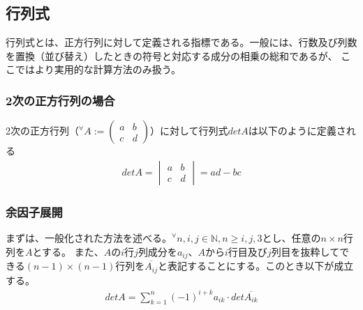\documentclass[10pt]{ujarticle}
\begin{document}
\subsection{行列式}
行列式とは、正方行列に対して定義される指標である。一般には、行数及び列数を置換（並び替え）したときの符号と対応する成分の相乗の総和であるが、
ここではより実用的な計算方法のみ扱う。

\subsubsection{2次の正方行列の場合}
2次の正方行列（$^\forall A:=(\begin{smallmatrix}a&b\\c&d\end{smallmatrix})$）に対して行列式$detA$は以下のように定義される
$$
\begin{aligned}
  detA=\begin{vmatrix} a & b\\ c & d \end{vmatrix}=ad-bc
\end{aligned}
$$
\subsubsection{余因子展開}
まずは、一般化された方法を述べる。$^\forall n,i,j\in\mathbb{N},n\geq i,j,3$とし、任意の$n\times n$行列を$A$とする。
また、$A$の$i$行$j$列成分を$a_{ij}$、$A$から$i$行目及び$j$列目を抜粋してできる$(n-1)\times(n-1)$行列を$\overline{A_{ij}}$と表記することにする。このとき以下が成立する。
$$
\begin{aligned}
  detA=\sum_{k=1}^{n}(-1)^{i+k}a_{ik}\cdot det\overline{A_{ik}}
\end{aligned}
$$
\end{document}
